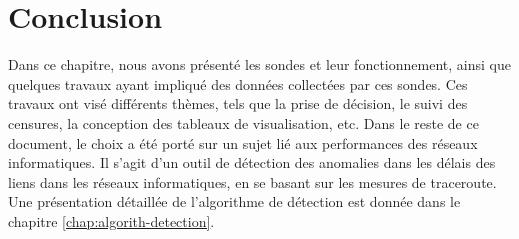 \section{Conclusion}

Dans ce chapitre, nous avons présenté les sondes  et leur fonctionnement, ainsi que quelques travaux ayant impliqué des données collectées par ces sondes.  Ces travaux ont visé différents thèmes, tels que la prise de décision, le suivi des censures, la conception des tableaux de visualisation, etc. Dans le reste de ce document, le choix a été porté sur un sujet lié aux performances des réseaux informatiques. Il s'agit d'un outil de détection des anomalies dans les délais des liens dans les réseaux informatiques, en se basant sur les mesures de traceroute. Une présentation détaillée de l'algorithme de détection est donnée dans le chapitre \ref{chap:algorith-detection}.






